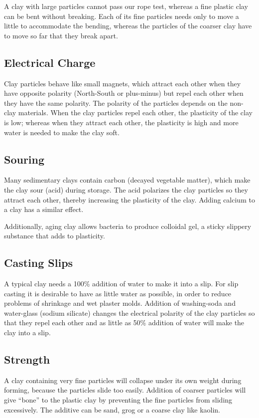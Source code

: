 A clay with large particles cannot pass our rope test, whereas a fine plastic 
clay can be bent without breaking. Each of its fine particles needs only to 
move a little to accommodate the bending, whereas the particles of the coarser 
clay have to move so far that they break apart.
\subsection{Electrical Charge}
Clay particles behave like small magnets, which attract each other when they 
have opposite polarity (North-South or plus-minus) but repel each other when 
they have the same polarity. The polarity of the particles depends on the 
non-clay materials. When the clay particles repel each other, the plasticity of 
the clay is low; whereas when they attract each other, the plasticity is high 
and more water is needed to make the clay soft.
\subsection{Souring}
Many sedimentary clays contain carbon (decayed vegetable matter), which make 
the clay sour (acid) during storage. The acid polarizes the clay particles so 
they attract each other, thereby increasing the plasticity of the clay. Adding 
calcium to a clay has a similar effect.

Additionally, aging clay allows bacteria to produce colloidal gel, a sticky 
slippery substance that adds to plasticity.
\subsection{Casting Slips}
A typical clay needs a 100\% addition of water to make it into a slip. For slip 
casting it is desirable to have as little water as possible, in order to reduce 
problems of shrinkage and wet plaster molds. Addition of washing-soda and 
water-glass (sodium silicate) changes the electrical polarity of the clay 
particles so that they repel each other and as little as 50\% addition of water 
will make the clay into a slip.
\subsection{Strength}
A clay containing very fine particles will collapse under its own weight during 
forming, because the particles slide too easily. Addition of coarser particles 
will give ``bone'' to the plastic clay by preventing the fine particles from 
sliding excessively. The additive can be sand, grog or a coarse clay like 
kaolin.

